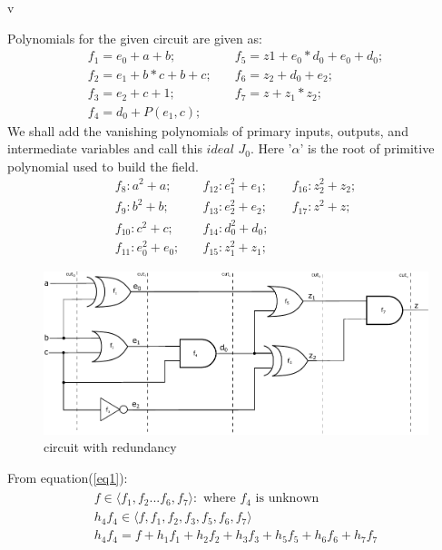 v\documentclass{article}
\newcommand{\al}{\alpha}
\begin{document}
 Polynomials for the given circuit are given as:
 \begin{equation}
 \begin{split}
 f_1 = e_0 + a + b; &\quad f_5 = z1 + e_0*d_0 + e_0 + d_0; \\
 f_2 = e_1 + b*c + b + c; &\quad f_6 = z_2 + d_0 + e_2; \\
 f_3 = e_2 + c + 1; &\quad f_7 = z + z_1*z_2; \\
 f_4 = d_0 + P(e_1,c);  
 \end{split}
 \end{equation}
 We shall add the vanishing polynomials of primary inputs, outputs, and intermediate variables and call this $ideal$ $J_0$. Here '$\al$' is the root of primitive polynomial used to build the field. 
\begin{align*}
 f_{8}:a^2 + a; &\quad f_{12}:e_1^2 + e_1; &\quad f_{16}:z_2^2 + z_2;\\
 f_{9}:b^2 + b; &\quad f_{13}:e_2^2 + e_2; &\quad f_{17}:z^2 + z;\\
 f_{10}:c^2 + c; &\quad f_{14}:d_0^2 + d_0; \\
 f_{11}:e_0^2 + e_0; &\quad f_{15}:z_1^2 + z_1; 
\end{align*}
 \begin{figure}[ht]
	\begin{center}
	\includegraphics[scale = 0.80]{tianka_ckt_c}
	\end{center}
	\vspace{-4ex}
	\caption{circuit with redundancy}
	\label{tianka_ckt_c}
	\vspace{-2ex}
\end{figure}

From equation(\ref{eq1}):
\begin{gather}
\begin{split}
f \in \langle f_1,f_2...f_6,f_7\rangle: \text{ where } f_4 \text{ is unknown}\\
h_4f_4 \in \langle f,f_1,f_2,f_3,f_5,f_6,f_7\rangle\\
h_4f_4 = f+h_1f_1+h_2f_2+h_3f_3+h_5f_5+h_6f_6+h_7f_7
\end{split}
\end{gather}
\end{document}
